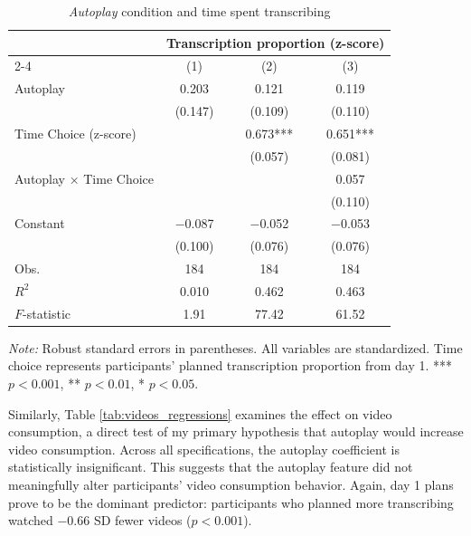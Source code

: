\documentclass[11pt,a4paper,oneside]{article}
\begin{document}
\begin{table}[H]
  \centering
  \caption{\textit{Autoplay} condition and time spent transcribing}
  \begin{threeparttable}
  \begin{tabular*}{\textwidth}{@{\extracolsep{\fill}}lccc}
  \toprule
  & \multicolumn{3}{c}{Transcription proportion (z-score) } \\
  \cmidrule(lr){2-4}
  & (1) & (2) & (3) \\
  \midrule
  Autoplay & 0.203 & 0.121 & 0.119 \\
  & (0.147) & (0.109) & (0.110) \\
  Time Choice (z-score) & & 0.673*** & 0.651*** \\
  & & (0.057) & (0.081) \\
  Autoplay × Time Choice & & & 0.057 \\
  & & & (0.110) \\
  Constant & $-$0.087 & $-$0.052 & $-$0.053 \\
  & (0.100) & (0.076) & (0.076) \\
  \midrule
  Obs. & 184 & 184 & 184 \\
  $R^2$ & 0.010 & 0.462 & 0.463 \\
  $F$-statistic & 1.91 & 77.42 & 61.52 \\
  \bottomrule
  \end{tabular*}
  \begin{tablenotes}[flushleft]
  \footnotesize
  \item[] \textit{Note:} Robust standard errors in parentheses. All variables are standardized. Time choice represents participants' planned transcription proportion from day 1. *** $p<0.001$, ** $p<0.01$, * $p<0.05$.
  \end{tablenotes}
  \end{threeparttable}
  \label{tab:typing_regressions}
\end{table}

Similarly, Table \ref{tab:videos_regressions} examines the effect on video consumption, a direct test of my primary hypothesis that autoplay would increase video consumption. Across all specifications, the autoplay coefficient is statistically insignificant. This suggests that the autoplay feature did not meaningfully alter participants' video consumption behavior. Again, day 1 plans prove to be the dominant predictor: participants who planned more transcribing watched $-0.66$ SD fewer videos ($p < 0.001$).
\end{document}
